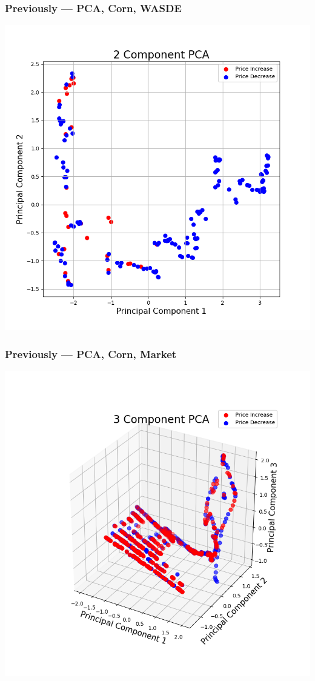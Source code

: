 \documentclass{beamer}
\begin{document}
\begin{frame}
\frametitle{Previously --- PCA, Corn, WASDE}
\begin{center}
\includegraphics[scale=.4]{images/fullcorn}
\end{center}
\end{frame}

\begin{frame}
\frametitle{Previously --- PCA, Corn, Market}
\begin{center}
\includegraphics[scale=.4]{images/cornmkt5,3d}
\end{center}
\end{frame}
\end{document}
